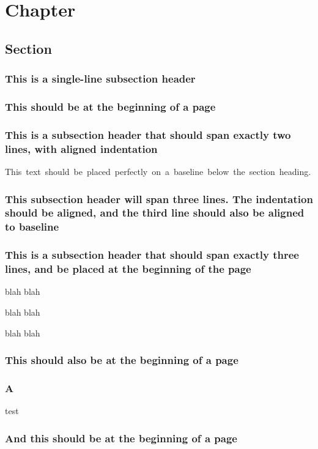 \documentclass[baselinegrid,parindent,noprint,nocopyright]{uit-thesis-test}
\begin{document}
\mainmatter

\chapter{Chapter}
\section{Section}
\subsection{This is a single-line subsection header}
\lipsum[1]

\lipsum[3-8]

\subsection{This should be at the beginning of a page}
\lipsum[9]

\subsection{This is a subsection header that should span exactly two lines, with aligned indentation}
\mbox{This~text~should~be~placed~perfectly~on~a~baseline~below~the~section~heading.}

\lipsum[10]

\subsection{This subsection header will span three lines. The indentation should be aligned, and the third line should also be aligned to baseline}
\lipsum[11-16]

\subsection{This is a subsection header that should span exactly three lines, and be placed at the beginning of the page}

\lipsum[17-20]

blah blah

blah blah

blah blah

\subsection{This should also be at the beginning of a page}
\subsection{A}
test

\newpage
\subsection{And this should be at the beginning of a page}
\end{document}
